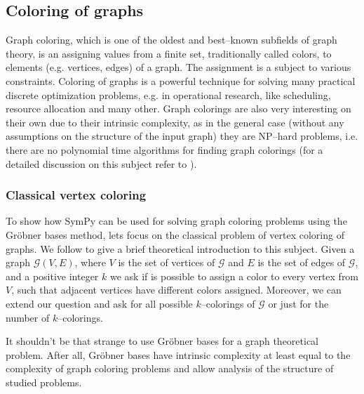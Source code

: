 \subsection{Coloring of graphs}

Graph coloring, which is one of the oldest and best--known subfields of graph theory, is an
assigning values from a finite set, traditionally called colors, to elements (e.g. vertices,
edges) of a graph. The assignment is a subject to various constraints. Coloring of graphs is
a powerful technique for solving many practical discrete optimization problems, e.g. in
operational research, like scheduling, resource allocation and many other. Graph colorings
are also very interesting on their own due to their intrinsic complexity, as in the general
case (without any assumptions on the structure of the input graph) they are NP--hard problems,
i.e. there are no polynomial time algorithms for finding graph colorings (for a detailed
discussion on this subject refer to \cite{Kubale2004color}).


\subsubsection{Classical vertex coloring}

To show how SymPy can be used for solving graph coloring problems using the Gröbner
bases method, lets focus on the classical problem of vertex coloring of graphs. We follow
\cite{Adams1994intro} to give a brief theoretical introduction to this subject. Given a graph
$\mathcal{G}(V, E)$, where $V$ is the set of vertices of $\mathcal{G}$ and $E$ is the set
of edges of $\mathcal{G}$, and a positive integer $k$ we ask if is possible to assign a
color to every vertex from $V$, such that adjacent vertices have different colors assigned.
Moreover, we can extend our question and ask for all possible $k$--colorings of $\mathcal{G}$
or just for the number of $k$--colorings.

It shouldn't be that strange to use Gröbner bases for a graph theoretical problem. After
all, Gröbner bases have intrinsic complexity at least equal to the complexity of graph
coloring problems and allow analysis of the structure of studied problems.

